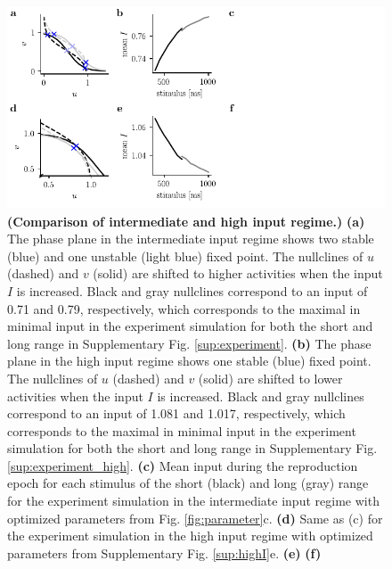 \documentclass[10pt]{article}
\begin{document}
\begin{figure}[!htb]
	\centering
	\includegraphics{figures/supp_comparison.pdf}
	\caption{\textbf{(Comparison of intermediate and high input regime.)}
	\textbf{(a)} The phase plane in the intermediate input regime shows two stable (blue) and one unstable (light blue) fixed point. The nullclines of $u$ (dashed) and $v$ (solid) are shifted to higher activities when the input $I$ is increased. Black and gray nullclines correspond to an input of 0.71 and 0.79, respectively, which corresponds to the maximal in minimal input in the experiment simulation for both the short and long range in Supplementary Fig. \ref{sup:experiment}.
	\textbf{(b)} The phase plane in the high input regime shows one stable (blue) fixed point. The nullclines of $u$ (dashed) and $v$ (solid) are shifted to lower activities when the input $I$ is increased. Black and gray nullclines correspond to an input of 1.081 and 1.017, respectively, which corresponds to the maximal in minimal input in the experiment simulation for both the short and long range in Supplementary Fig. \ref{sup:experiment_high}.
	\textbf{(c)} Mean input during the reproduction epoch for each stimulus of the short (black) and long (gray) range for the experiment simulation in the intermediate input regime with optimized parameters from Fig. \ref{fig:parameter}c.
	\textbf{(d)} Same as (c) for the experiment simulation in the high input regime with optimized parameters from Supplementary Fig. \ref{sup:highI}e.
	\textbf{(e)} 
	\textbf{(f)} 
	}
\label{sup:comparison}
\end{figure}

\pagebreak
\end{document}
